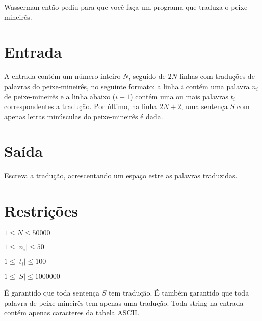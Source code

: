 Wasserman então pediu para que você faça um programa que traduza o peixe-mineirês.

\section*{Entrada}

A entrada contém um número inteiro $N$, seguido de $2N$ linhas com traduções de palavras
do peixe-mineirês, no seguinte formato: a linha $i$ contém uma palavra $n_i$ de peixe-mineirês 
e a linha abaixo ($i+1$) contém uma ou mais palavras $t_i$ correspondentes 
a tradução.
Por último, na linha $2N + 2$, uma 
sentença $S$ com apenas letras minúsculas do peixe-mineirês é dada. 

\section*{Saída}

Escreva a tradução, acrescentando um espaço estre as palavras traduzidas.

\section*{Restrições}

$1 \le N \le 50000$

$1 \le |n_i| \le 50$

$1 \le |t_i| \le 100$

$1 \le |S| \le 1000000$ 

É garantido que toda sentença $S$ tem tradução. É também garantido
que toda palavra de peixe-mineirês tem apenas uma tradução.
Toda string na entrada contém apenas caracteres da tabela ASCII.

\exemplo
